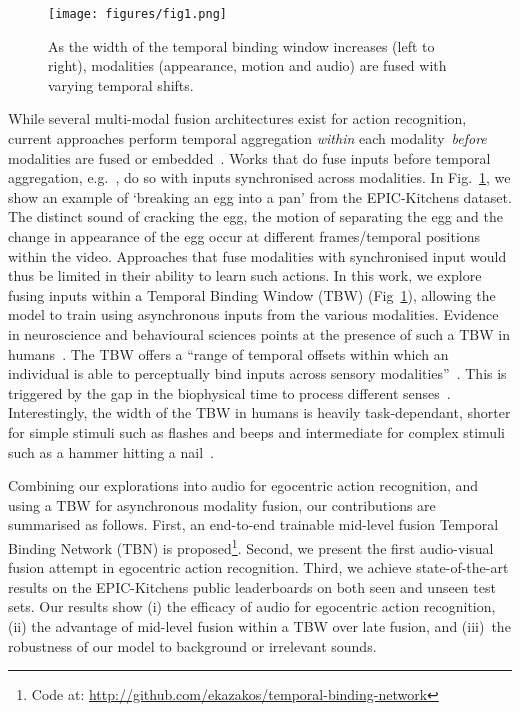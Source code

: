 \documentclass[10pt,twocolumn,letterpaper]{article}
\begin{document}
 \begin{figure}[t]
	\centering
	\texttt{[image: figures/fig1.png]}
	\caption{As the width of the temporal binding window increases (left to right), modalities (appearance, motion and audio) are fused with varying temporal shifts.}
	\label{fig:tbw_sampling}
\end{figure}
While several multi-modal fusion architectures exist for action recognition, current approaches perform temporal aggregation {\em within} each modality~\textit{before} modalities are fused \cite{TSN2016ECCV,MiechLS17} or embedded~\cite{TextVideo}. Works that do fuse inputs before temporal aggregation, e.g.~\cite{Feichtenhofer_2016_CVPR}, do so with inputs synchronised across modalities.
In Fig.~\ref{fig:tbw_sampling}, we show an example of `breaking an egg into a pan' from the EPIC-Kitchens dataset. The distinct sound of cracking the egg, the motion of separating the egg and the change in appearance of the egg occur at different frames/temporal positions within the video. Approaches that fuse modalities with synchronised input would thus be limited in their ability to learn such actions.
In this work, we explore fusing inputs within a Temporal Binding Window (TBW) (Fig~\ref{fig:tbw_sampling}), allowing the model 
to train using asynchronous inputs from the various modalities. 
Evidence in neuroscience and behavioural sciences points at the presence of such a TBW in humans~\cite{PARISE201246,WALLACE2014105}. The TBW offers a ``range of temporal offsets within which an individual is able to perceptually bind inputs across sensory modalities''~\cite{Stevenson2013}.
This is triggered by the gap in the biophysical time to process different senses~\cite{Megavand2013}.
Interestingly, the width of the TBW in humans is heavily task-dependant, shorter for simple stimuli such as flashes and beeps and intermediate for complex stimuli such as a hammer hitting a nail~\cite{WALLACE2014105}. 

Combining our explorations into audio for egocentric action recognition, and using a TBW for asynchronous modality fusion, our contributions are summarised as follows. First, an end-to-end trainable mid-level fusion Temporal Binding Network (TBN) is proposed\footnote{ Code at: \url{http://github.com/ekazakos/temporal-binding-network}}. 
Second, we present the first audio-visual fusion attempt in egocentric action recognition.  Third, we achieve state-of-the-art results on the EPIC-Kitchens public leaderboards on both seen and unseen test sets. Our results show (i) the efficacy of audio for egocentric action recognition, (ii) the advantage of mid-level fusion within a TBW over late fusion, and (iii)~the robustness of our model to background or irrelevant sounds. 
\end{document}
